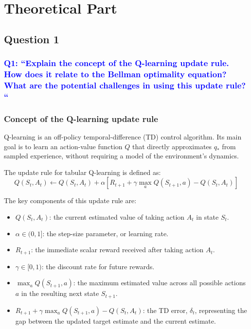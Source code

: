 \documentclass{scrartcl}
\title{\reportname}
\subtitle{Assignment 2 - Lunar Lander}
\author{
    \textbf{Authors:} \\
    \textbf{Martin Nilsson}, \textit{School of Engineering}, Jönköping University
    \and
    \textbf{Besan Ewir}, \textit{School of Engineering}, Jönköping University
    \and
    \textbf{Vladimir Giustacchini}, \textit{School of Engineering}, Jönköping University
    \and
    \textbf{Jorge Cuello}, \textit{School of Engineering}, Jönköping University
}
\date{\today}
\theoremstyle{mytheoremstyle}
\theoremstyle{mytheoremstyle}
\theoremstyle{myproblemstyle}
\begin{document}
\raggedright

\maketitle

\tableofcontents

\newpage


\section{Theoretical Part}

\subsection{Question 1}

\subsubsection*{\textcolor{blue}{Q1: ``Explain the concept of the Q-learning update rule. How does it relate to the Bellman optimality equation? What are the potential challenges in using this update rule? ``}}

\subsubsection{Concept of the Q-learning update rule}

Q-learning is an off-policy temporal-difference (TD) control algorithm. Its main goal is to learn an
action-value function $Q$ that directly approximates $q_*$ from sampled experience, without requiring
a model of the environment's dynamics.

The update rule for tabular Q-learning is defined as:
\[
    Q(S_t, A_t) \leftarrow Q(S_t, A_t) + \alpha \left[ R_{t+1} + \gamma \max_{a} Q(S_{t+1}, a) - Q(S_t, A_t) \right]
\]

The key components of this update rule are:
\begin{itemize}
    \item $Q(S_t, A_t)$: the current estimated value of taking action $A_t$ in state $S_t$.
    \item $\alpha \in (0,1]$: the step-size parameter, or learning rate.
    \item $R_{t+1}$: the immediate scalar reward received after taking action $A_t$.
    \item $\gamma \in [0,1)$: the discount rate for future rewards.
    \item $\max_{a} Q(S_{t+1}, a)$: the maximum estimated value across all possible actions $a$ in the
          resulting next state $S_{t+1}$.
    \item $R_{t+1} + \gamma \max_{a} Q(S_{t+1}, a) - Q(S_t, A_t)$: the TD error, $\delta_t$, representing
          the gap between the updated target estimate and the current estimate.
\end{itemize}
\end{document}
